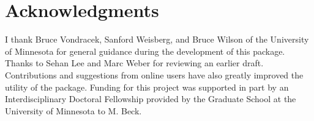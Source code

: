 \documentclass[article,shortnames]{jss}
\begin{document}
\section[Acknowledgments]{Acknowledgments}
 
I thank Bruce Vondracek, Sanford Weisberg, and Bruce Wilson of the University of Minnesota for general guidance during the development of this package.  Thanks to Sehan Lee and Marc Weber for reviewing an earlier draft.  Contributions and suggestions from online users have also greatly improved the utility of the package.  Funding for this project was supported in part by an Interdisciplinary Doctoral Fellowship provided by the Graduate School at the University of Minnesota to M. Beck.  

% 
% 

\end{document}
